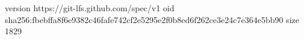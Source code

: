 version https://git-lfs.github.com/spec/v1
oid sha256:fbebffa8f6e9382c46fafe742cf2e5295e2f0b8ed6f262ce3e24c7e364e5bb90
size 1829
